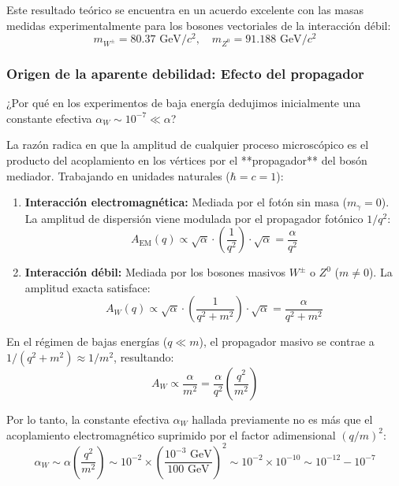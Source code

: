 Este resultado teórico se encuentra en un acuerdo excelente con las masas medidas experimentalmente para los bosones vectoriales de la interacción débil:
\begin{equation}
    m_{W^\pm} = 80.37 \text{ GeV}/c^2, \quad m_{Z^0} = 91.188 \text{ GeV}/c^2
\end{equation}

\newpage
\subsubsection{Origen de la aparente debilidad: Efecto del propagador}

¿Por qué en los experimentos de baja energía dedujimos inicialmente una constante efectiva $\alpha_W \sim 10^{-7} \ll \alpha$?

La razón radica en que la amplitud de cualquier proceso microscópico es el producto del acoplamiento en los vértices por el **propagador** del bosón mediador. Trabajando en unidades naturales ($\hbar = c = 1$):

\begin{enumerate}
    \item \textbf{Interacción electromagnética:} Mediada por el fotón sin masa ($m_\gamma = 0$). La amplitud de dispersión viene modulada por el propagador fotónico $1/q^2$:
    \begin{equation}
        A_{\text{EM}}(q) \propto \sqrt{\alpha} \cdot \left( \frac{1}{q^2} \right) \cdot \sqrt{\alpha} = \frac{\alpha}{q^2}
    \end{equation}
    
    \item \textbf{Interacción débil:} Mediada por los bosones masivos $W^\pm$ o $Z^0$ ($m \neq 0$). La amplitud exacta satisface:
    \begin{equation}
        A_W(q) \propto \sqrt{\alpha} \cdot \left( \frac{1}{q^2 + m^2} \right) \cdot \sqrt{\alpha} = \frac{\alpha}{q^2 + m^2}
    \end{equation}
\end{enumerate}

En el régimen de bajas energías ($q \ll m$), el propagador masivo se contrae a $1/(q^2 + m^2) \approx 1/m^2$, resultando:
\begin{equation}
    A_W \propto \frac{\alpha}{m^2} = \frac{\alpha}{q^2} \left( \frac{q^2}{m^2} \right)
\end{equation}

Por lo tanto, la constante efectiva $\alpha_W$ hallada previamente no es más que el acoplamiento electromagnético suprimido por el factor adimensional $(q/m)^2$:
\begin{equation}
    \alpha_W \sim \alpha \left( \frac{q^2}{m^2} \right) \sim 10^{-2} \times \left( \frac{10^{-3} \text{ GeV}}{100 \text{ GeV}} \right)^2 \sim 10^{-2} \times 10^{-10} \sim 10^{-12} - 10^{-7}
\end{equation}


